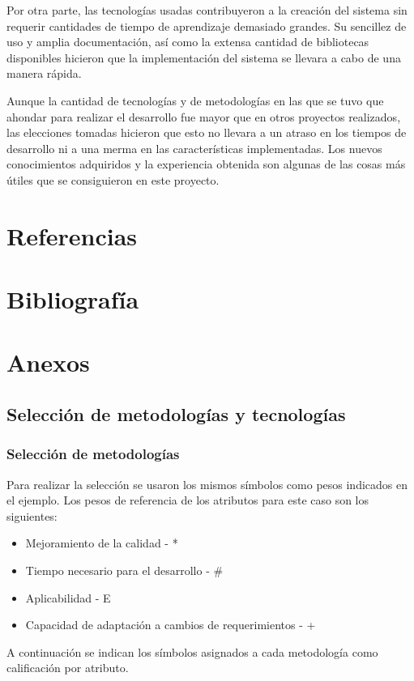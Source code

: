 \documentclass[twoside]{article}
\begin{document}
Por otra parte, las tecnologías usadas contribuyeron a la creación del sistema sin requerir cantidades de tiempo de aprendizaje demasiado grandes. Su sencillez de uso y amplia documentación, así como la extensa cantidad de bibliotecas disponibles hicieron que la implementación del sistema se llevara a cabo de una manera rápida.

Aunque la cantidad de tecnologías y de metodologías en las que se tuvo que ahondar para realizar el desarrollo fue mayor que en otros proyectos realizados, las elecciones tomadas hicieron que esto no llevara a un atraso en los tiempos de desarrollo ni a una merma en las características implementadas. Los nuevos conocimientos adquiridos y la experiencia obtenida son algunas de las cosas más útiles que se consiguieron en este proyecto.
\newpage
\section*{Referencias}
\begin{sloppypar}
\printbibliography[heading=none,category=cited]
\end{sloppypar}
\section*{Bibliografía}
\printbibliography[heading=none,notcategory=cited]
\newpage
\section*{Anexos}
\subsection{Selección de metodologías y tecnologías}
\subsubsection{Selección de metodologías}
Para realizar la selección se usaron los mismos símbolos como pesos indicados en el ejemplo. Los pesos de referencia de los atributos para este caso son los siguientes:
\begin{itemize}
    \item Mejoramiento de la calidad - *
    \item Tiempo necesario para el desarrollo - \#
    \item Aplicabilidad - E
    \item Capacidad de adaptación a cambios de requerimientos - +
\end{itemize}
A continuación se indican los símbolos asignados a cada metodología como calificación por atributo.
\end{document}
